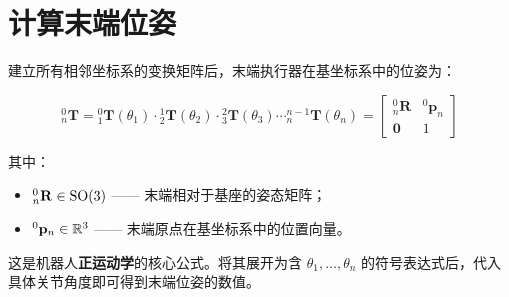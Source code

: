\section{计算末端位姿}

建立所有相邻坐标系的变换矩阵后，末端执行器在基坐标系中的位姿为：

\[
{}^{0}_{n}\mathbf{T} = {}^{0}_{1}\mathbf{T}(\theta_1) \cdot {}^{1}_{2}\mathbf{T}(\theta_2) \cdot {}^{2}_{3}\mathbf{T}(\theta_3) \cdots {}^{n-1}_{n}\mathbf{T}(\theta_n) = \begin{bmatrix}
	{}^{0}_{n}\mathbf{R} & {}^{0}\mathbf{p}_{n} \\
	\mathbf{0} & 1
\end{bmatrix}
\]

其中：
\begin{itemize}
	\item ${}^{0}_{n}\mathbf{R} \in \mathrm{SO}(3)$ —— 末端相对于基座的姿态矩阵；
	\item ${}^{0}\mathbf{p}_{n} \in \mathbb{R}^3$ —— 末端原点在基坐标系中的位置向量。
\end{itemize}

这是机器人\textbf{正运动学}的核心公式。将其展开为含 $\theta_1, \ldots, \theta_n$ 的符号表达式后，代入具体关节角度即可得到末端位姿的数值。

